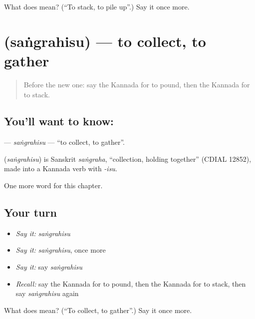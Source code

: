 \begin{tcolorbox}[breakable,colback=teal!4,colframe=teal!35!black,title={Before you move on}]
What does  mean? (\textquotedblleft{}To stack, to pile up\textquotedblright{}.) Say it once more.
\end{tcolorbox}
\section[\texorpdfstring{\kn{ಸಂಗ್ರಹಿಸು} (saṅgrahisu)}{ಸಂಗ್ರಹಿಸು (saṅgrahisu)}]{ (saṅgrahisu) — to collect, to gather}

\label{lesson:KA-C207-sangrahisu}



\begin{quote}
Before the new one: say the Kannada for to pound, then the Kannada for to stack.
\end{quote}

\subsection*{You'll want to know: }
\textbf{} — \emph{saṅgrahisu} — \textquotedblleft{}to collect, to gather\textquotedblright{}.

\begin{cousinweb}
\textbf{} (\emph{saṅgrahisu}) is Sanskrit \emph{saṅgraha}, \textquotedblleft{}collection, holding together\textquotedblright{} (CDIAL 12852), made into a Kannada verb with \emph{-isu}.
\end{cousinweb}

\begin{grammarlens}[title={What you've built}]
One more word for this chapter.
\end{grammarlens}

\subsection*{Your turn}
\begin{itemize}
\raggedright
  \item \emph{Say it:} \emph{saṅgrahisu}
  \item \emph{Say it:} \emph{saṅgrahisu}, once more
  \item \emph{Say it:} say \emph{saṅgrahisu}
  \item \emph{Recall:} say the Kannada for to pound, then the Kannada for to stack, then say \emph{saṅgrahisu} again
\end{itemize}

\begin{tcolorbox}[breakable,colback=teal!4,colframe=teal!35!black,title={Before you move on}]
What does  mean? (\textquotedblleft{}To collect, to gather\textquotedblright{}.) Say it once more.
\end{tcolorbox}
